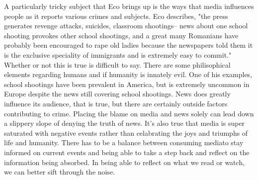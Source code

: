\documentclass{article}
\begin{document}
A particularly tricky subject that Eco brings up is the ways that media influences people as it reports various crimes and subjects. Eco describes, "the press generates revenge attacks, suicides, classroom shootings-- news about one school shooting provokes other school shootings, and a great many Romanians have probably been encouraged to rape old ladies because the newspapers told them it is the exclusive speciality of immigrants and is extremely easy to commit." Whether or not this is true is difficult to say. There are some philisophical elements regarding humans and if humanity is innately evil. One of his examples, school shootings have been prevalent in America, but is extremely uncommon in Europe despite the news still covering school shootings. News does greatly influence its audience, that is true, but there are certainly outside factors contributing to crime. Placing the blame on media and news solely can lead down a slippery slope of denying the truth of news. It's also true that media is super saturated with negative events rather than celabrating the joys and triumphs of life and humanity. There has to be a balance between consuming mediato stay informed on current events and being able to take a step back and reflect on the information being absorbed. In being able to reflect on what we read or watch, we can better sift through the noise. 
\end{document}
